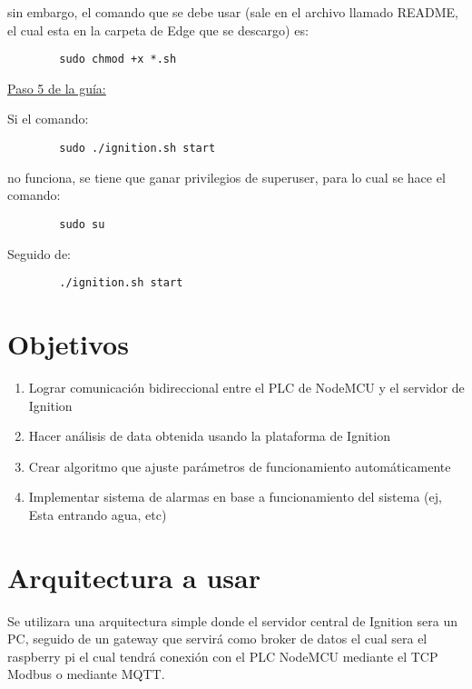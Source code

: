 \documentclass[12pt]{article}
\begin{document}
	sin embargo, el comando que se debe usar (sale en el archivo llamado README, el cual esta en la carpeta de Edge que se descargo) es:
	
	\begin{verbatim}
		sudo chmod +x *.sh
	\end{verbatim}
	
	\underline{Paso 5 de la guía:}
	
	\vspace{5mm}
	
	Si el comando: 
	
	\begin{verbatim}
		sudo ./ignition.sh start
	\end{verbatim}
	
	no funciona, se tiene que ganar privilegios de superuser, para lo cual se hace el comando:
	
	\begin{verbatim}
		sudo su
	\end{verbatim}
	
	Seguido de:
	
	\begin{verbatim}
		./ignition.sh start
	\end{verbatim}
	
	\section{Objetivos}
	
	\begin{enumerate}
		\item Lograr comunicación bidireccional entre el PLC de NodeMCU y el servidor de Ignition
		\item Hacer análisis de data obtenida usando la plataforma de Ignition
		\item Crear algoritmo que ajuste parámetros de funcionamiento automáticamente
		\item Implementar sistema de alarmas en base a funcionamiento del sistema (ej, Esta entrando agua, etc)
	\end{enumerate}
	
	\section{Arquitectura a usar}
	
	Se utilizara una arquitectura simple donde el servidor central de Ignition sera un PC, seguido de un gateway que servirá como broker de datos el cual sera el raspberry pi el cual tendrá conexión con el  PLC NodeMCU mediante el TCP Modbus o mediante MQTT.
	
\end{document}
